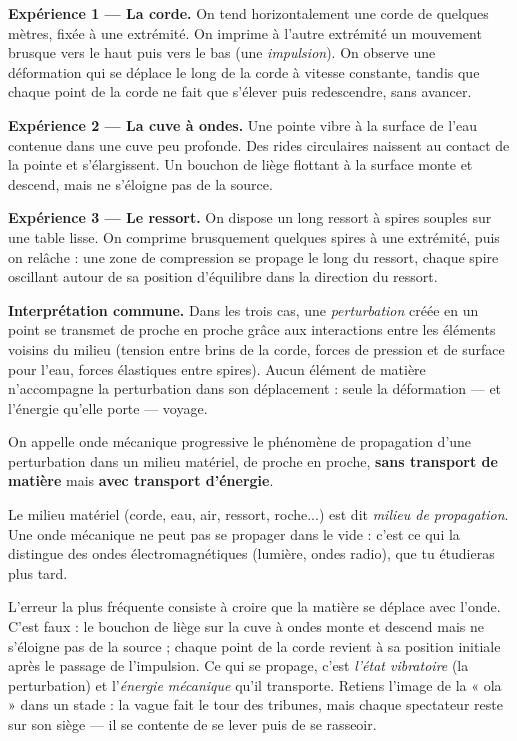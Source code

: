 \documentclass[11pt]{article}
\newcommand{\cle}[1]{{\popxbold\color{popdark}#1}}
\newcounter{popsec}
\newcounter{popsub}
\newcommand{\courssub}[1]{%
  \stepcounter{popsub}%
  \par\vspace{9pt}\noindent{\popxbold\fontsize{11.5}{13}\selectfont\color{popink}{\color{poporange}\thepopsec.\thepopsub}\hspace{6pt}#1}\par\nopagebreak\vspace{4pt}
}
\begin{document}
\courssub{Mise en évidence expérimentale}

\begin{experience}
\textbf{Expérience 1 — La corde.} On tend horizontalement une corde de quelques mètres, fixée à une extrémité. On imprime à l'autre extrémité un mouvement brusque vers le haut puis vers le bas (une \emph{impulsion}). On observe une déformation qui se déplace le long de la corde à vitesse constante, tandis que chaque point de la corde ne fait que s'élever puis redescendre, sans avancer.

\textbf{Expérience 2 — La cuve à ondes.} Une pointe vibre à la surface de l'eau contenue dans une cuve peu profonde. Des rides circulaires naissent au contact de la pointe et s'élargissent. Un bouchon de liège flottant à la surface monte et descend, mais ne s'éloigne pas de la source.

\textbf{Expérience 3 — Le ressort.} On dispose un long ressort à spires souples sur une table lisse. On comprime brusquement quelques spires à une extrémité, puis on relâche : une zone de compression se propage le long du ressort, chaque spire oscillant autour de sa position d'équilibre dans la direction du ressort.

\textbf{Interprétation commune.} Dans les trois cas, une \emph{perturbation} créée en un point se transmet de proche en proche grâce aux interactions entre les éléments voisins du milieu (tension entre brins de la corde, forces de pression et de surface pour l'eau, forces élastiques entre spires). Aucun élément de matière n'accompagne la perturbation dans son déplacement : seule la déformation — et l'énergie qu'elle porte — voyage.
\end{experience}

\begin{definition}
On appelle \cle{onde mécanique progressive} le phénomène de propagation d'une perturbation dans un milieu matériel, de proche en proche, \textbf{sans transport de matière} mais \textbf{avec transport d'énergie}.

Le milieu matériel (corde, eau, air, ressort, roche...) est dit \emph{milieu de propagation}. Une onde mécanique ne peut pas se propager dans le vide : c'est ce qui la distingue des ondes électromagnétiques (lumière, ondes radio), que tu étudieras plus tard.
\end{definition}

\begin{attention}
L'erreur la plus fréquente consiste à croire que la matière se déplace avec l'onde. C'est faux : le bouchon de liège sur la cuve à ondes monte et descend mais ne s'éloigne pas de la source ; chaque point de la corde revient à sa position initiale après le passage de l'impulsion. Ce qui se propage, c'est \emph{l'état vibratoire} (la perturbation) et l'\emph{énergie mécanique} qu'il transporte. Retiens l'image de la « ola » dans un stade : la vague fait le tour des tribunes, mais chaque spectateur reste sur son siège — il se contente de se lever puis de se rasseoir.
\end{attention}
\end{document}
